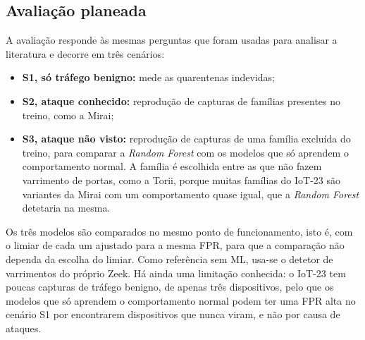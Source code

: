 \documentclass[conference,a4paper]{IEEEtran}
\begin{document}
\subsection{Avaliação planeada}
A avaliação responde às mesmas perguntas que foram usadas para analisar a literatura e
decorre em três cenários:
\begin{itemize}
  \item \textbf{S1, só tráfego benigno:} mede as quarentenas indevidas;
  \item \textbf{S2, ataque conhecido:} reprodução de capturas de famílias presentes no
  treino, como a Mirai;
  \item \textbf{S3, ataque não visto:} reprodução de capturas de uma família excluída do
  treino, para comparar a \textit{Random Forest} com os modelos que só aprendem o
  comportamento normal. A família é escolhida entre as que não fazem varrimento de portas,
  como a Torii, porque muitas famílias do IoT-23 são variantes da Mirai com um
  comportamento quase igual, que a \textit{Random Forest} detetaria na mesma.
\end{itemize}

Os três modelos são comparados no mesmo ponto de funcionamento, isto é, com o limiar de
cada um ajustado para a mesma FPR, para que a comparação não dependa da escolha do
limiar. Como referência sem ML, usa-se o detetor de varrimentos do próprio Zeek. Há
ainda uma limitação conhecida: o IoT-23 tem poucas capturas de tráfego benigno, de
apenas três dispositivos, pelo que os modelos que só aprendem o comportamento normal
podem ter uma FPR alta no cenário S1 por encontrarem dispositivos que nunca viram, e não
por causa de ataques.
\end{document}
